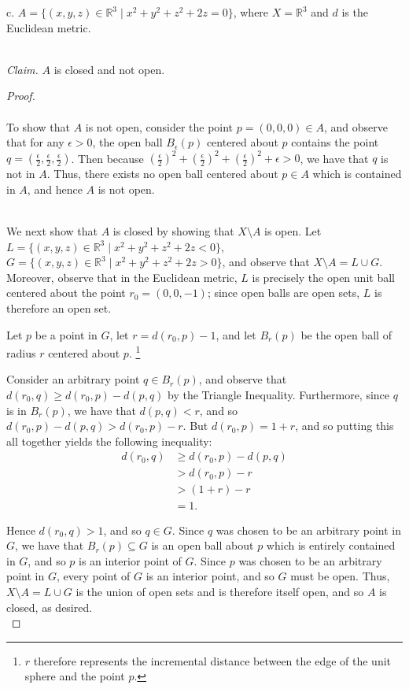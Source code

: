 \pagebreak

c.  $A = \{(x, y, z) \in \mathbb{R}^3 \mid x^2 + y^2 + z^2 + 2z = 0 \}$, where $X = \mathbb{R}^3$ and $d$ is the 
    Euclidean metric.

\ \\
\emph{Claim.} $A$ is closed and not open.

\begin{proof}\ \\\\
    To show that $A$ is not open, consider the point $p = (0, 0, 0) \in A$, and observe that for any $\epsilon > 0$, the 
    open ball $B_\epsilon(p)$ centered about $p$ contains the point 
    $q = \left( \frac{\epsilon}{2}, \frac{\epsilon}{2}, \frac{\epsilon}{2} \right)$. Then because 
    $(\frac{\epsilon}{2})^2 + (\frac{\epsilon}{2})^2 + (\frac{\epsilon}{2})^2 + \epsilon > 0$, we have that $q$
    is not in $A$. Thus, there exists no open ball centered about $p \in A$ which is contained in $A$, and hence $A$ is
    not open.

    \ \\
    We next show that $A$ is closed by showing that $X \setminus A$ is open. Let  \linebreak
    $L = \{(x, y, z) \in \mathbb{R}^3 \mid x^2 + y^2 + z^2 + 2z < 0 \}$,
    $G = \{(x, y, z) \in \mathbb{R}^3 \mid x^2 + y^2 + z^2 + 2z > 0 \}$, and observe that $X \setminus A = L \cup G$.
    Moreover, observe that in the Euclidean metric, $L$ is precisely the open unit ball centered about the point 
    $r_0 = (0, 0, -1)$; since open balls are open sets, $L$ is therefore an open set.

    Let $p$ be a point in $G$, let $r = d(r_0, p) - 1$, and let $B_r(p)$ be the open ball of radius $r$ centered about
    $p$. \footnote{
        $r$ therefore represents the incremental distance between the edge of the unit sphere and the point $p$.
    }

    Consider an arbitrary point $q \in B_r(p)$, and observe that $d(r_0, q) \ge d(r_0, p) - d(p, q)$ by the Triangle
    Inequality. Furthermore, since $q$ is in $B_r(p)$, we have that $d(p, q) < r$, and so 
    $d(r_0, p) - d(p, q) > d(r_0, p) - r$. But $d(r_0, p) = 1 + r$, and so putting this all together yields the 
    following inequality:
    \begin{align*}
        d(r_0, q) &\ge d(r_0, p) - d(p, q) \\
                  &> d(r_0, p) - r \\
                  &> (1 + r) - r \\
                  &= 1.
    \end{align*}

    Hence $d(r_0, q) > 1$, and so $q \in G$. Since $q$ was chosen to be an arbitrary point in $G$, we have that 
    $B_r(p) \subseteq G$ is an open ball about $p$ which is entirely contained in $G$, and so $p$ is an interior point
    of $G$. Since $p$ was chosen to be an arbitrary point in $G$, every point of $G$ is an interior point, and so $G$
    must be open. Thus, $X \setminus A = L \cup G$ is the union of open sets and is therefore itself open, and so $A$
    is closed, as desired.
    \ \\
\end{proof}

